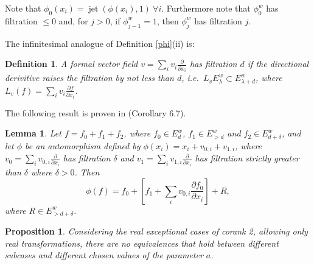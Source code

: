 \documentclass[noend]{amsproc}
\newtheorem{defn}[theorem]{Definition}
\newtheorem{prop}[theorem]{Proposition}
\newtheorem{lemma}[theorem]{Lemma}
\theoremstyle{definition}
\DeclareMathOperator{\jet}{jet}
\begin{document}
Note that $\phi_0(x_i)=\jet(\phi(x_i),1)\ \forall i$. Furthermore note that $\phi_0^w$ has filtration $\le 0$ and, for $j>0$, if $\phi_{j-1}^w=1$, then $\phi_j^w$ has filtration $j$. 


The infinitesimal analogue of Definition \ref{phi}(ii) is:

\begin{defn}
A formal vector field $v=\sum_i v_i\frac{\partial}{\partial x_i}$ has filtration $d$ if the directional derivitive raises the filtration by not less than $d$, i.e.~$L_vE^w_\lambda\subset E^w_{\lambda+d}$, where $L_v(f)=\sum_i v_i\frac{\partial f}{\partial x_i}$.
\end{defn}

The following result is proven in \cite{A1974} (Corollary 6.7).

\begin{lemma}\label{vectorlemma}
Let $f=f_0+f_1+f_2$, where $f_0\in E^w_d$, $f_1\in E^w_{>d}$ and $f_2\in E^w_{d+\delta}$, and let $\phi$ be an automorphism defined by $\phi(x_i)=x_i+v_{0,i}+v_{1,i}$, where $v_0=\sum_iv_{0,i}\frac{\partial}{\partial x_i}$ has filtration $\delta$ and $v_1=\sum_iv_{1,i}\frac{\partial}{\partial x_i}$ has filtration strictly greater than $\delta$ where $\delta>0$. Then
\[\phi(f)=f_0+\left[ f_1+\sum_iv_{0,i}\frac{\partial f_0}{\partial x_i}\right]+R,\]
where $R\in E^w_{>d+\delta}$.
\end{lemma}



\begin{prop}
Considering the real exceptional cases of corank 2, allowing only real transformations, there are no equivalences that hold between different subcases and different chosen values of the parameter $a$.
\end{prop}
\end{document}
